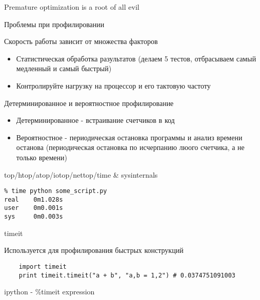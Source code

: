 \documentclass{article}
\begin{document}
\LARGE

\begin{center} Premature optimization is a root of all evil \end{center}
\newpage

\begin{center} Проблемы при профилировании \end{center}
Скорость работы зависит от множества факторов
\begin{itemize}
    \item Статистическая обработка разультатов (делаем 5 тестов, отбрасываем самый медленный и самый быстрый)
    \item Контролируйте нагрузку на процессор и его тактовую частоту
\end{itemize}
\newpage

\begin{center} Детерминированное и вероятностное профилирование \end{center}
\begin{itemize}
    \item Детерминированное - встраивание счетчиков в код
    \item Вероятностное - периодическая остановка программы и анализ времени останова
    (периодическая остановка по исчерпанию люого счетчика, а не только времени)
\end{itemize}
\newpage

\begin{center} top/htop/atop/iotop/nettop/time \& sysinternals \end{center}
\begin{verbatim}
% time python some_script.py
real    0m1.028s
user    0m0.001s
sys     0m0.003s
\end{verbatim}
\newpage

\begin{center} timeit \end{center}
Используется для профилирования быстрых конструкций
\begin{lstlisting}
    import timeit
    print timeit.timeit("a + b", "a,b = 1,2") # 0.0374751091003
\end{lstlisting}
ipython - \%timeit expression
\newpage
\end{document}
